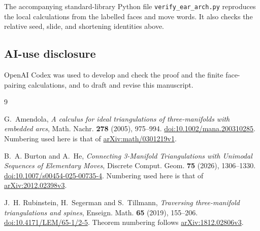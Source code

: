 \documentclass[11pt]{amsart}
\begin{document}
\begin{samepage}
The accompanying standard-library Python file
\texttt{verify\_ear\_arch.py} reproduces the local calculations from
the labelled faces and move words. It also checks the relative
seed, slide, and shortening identities above.

\subsection*{AI-use disclosure}
OpenAI Codex was used to develop and check the proof and the finite
face-pairing calculations, and to draft and revise this manuscript.
\end{samepage}

\begin{thebibliography}{9}

G.~Amendola, \emph{A calculus for ideal triangulations of three-manifolds
with embedded arcs}, Math. Nachr. \textbf{278} (2005), 975--994.
\href{https://doi.org/10.1002/mana.200310285}{doi:10.1002/mana.200310285}.
Numbering used here is that of
\href{https://arxiv.org/abs/math/0301219v1}{arXiv:math/0301219v1}.

B.~A. Burton and A.~He, \emph{Connecting 3-Manifold Triangulations with
Unimodal Sequences of Elementary Moves}, Discrete Comput. Geom.
\textbf{75} (2026), 1306--1330.
\href{https://doi.org/10.1007/s00454-025-00735-4}{doi:10.1007/s00454-025-00735-4}.
Numbering used here is that of \href{https://arxiv.org/abs/2012.02398v3}{arXiv:2012.02398v3}.

J.~H. Rubinstein, H.~Segerman and S.~Tillmann, \emph{Traversing
three-manifold triangulations and spines}, Enseign. Math. \textbf{65}
(2019), 155--206.
\href{https://doi.org/10.4171/LEM/65-1/2-5}{doi:10.4171/LEM/65-1/2-5}.
Theorem numbering follows
\href{https://arxiv.org/abs/1812.02806v3}{arXiv:1812.02806v3}.

\end{thebibliography}
\end{document}
